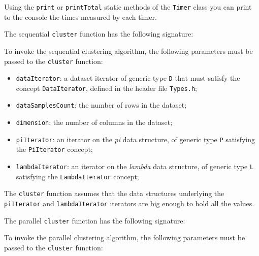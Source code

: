 \documentclass{article}
\begin{document}
Using the \texttt{print} or \texttt{printTotal} static methods of the \texttt{Timer} class you
can print to the console the times measured by each timer.


%
%
%
%
%
%
%
%
\clearpage

The sequential \texttt{cluster} function has the following signature:

To invoke the sequential clustering algorithm, the following parameters
must be passed to the \texttt{cluster} function:

\begin{itemize}

\item
\texttt{dataIterator}: a dataset iterator of generic type \texttt{D}
that must satisfy the concept \texttt{DataIterator}, defined in the
header file \texttt{Types.h};
\item
\texttt{dataSamplesCount}: the number of rows in the dataset;
\item
\texttt{dimension}: the number of columns in the dataset;
\item
\texttt{piIterator}: an iterator on the \emph{pi} data structure, of
generic type \texttt{P} satisfying the \texttt{PiIterator} concept;
\item
\texttt{lambdaIterator}: an iterator on the \emph{lambda} data
structure, of generic type \texttt{L} satisfying the
\texttt{LambdaIterator} concept;
\end{itemize}

The \texttt{cluster} function assumes that the data structures
underlying the \texttt{piIterator} and \texttt{lambdaIterator} iterators
are big enough to hold all the values.


The parallel \texttt{cluster} function has the following signature:

To invoke the parallel clustering algorithm, the following parameters
must be passed to the \texttt{cluster} function:
\end{document}
